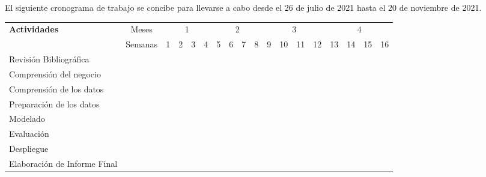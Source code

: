 \documentclass[11pt,letterpaper,oneside]{article}
\begin{document}
	El siguiente cronograma de trabajo se concibe para llevarse a cabo desde el 26 de julio de 2021 hasta el 20 de noviembre de 2021.
	
	\begin{center}
	\centering
	\tiny 
	
	\begin{tabular}{ |l c|c|c|c|c|c|c|c|c|c|c|c|c|c|c|c|c| }
	 \hline
	 \textbf{Actividades} & Meses & 
	 \multicolumn{4}{c|}{1} & 
	 \multicolumn{4}{c|}{2} & 
	 \multicolumn{4}{c|}{3} & 
	 \multicolumn{4}{c|}{4} 
	 \\ \cline{3-18}
	 
	 & Semanas & 
	 1 & 2 & 3 & 4 & 5 & 6 & 7 & 8 & 9 & 10 & 11 & 12 & 13 & 14 & 15 & 16 
	 \\ \hline
	 
	 Revisión Bibliográfica & &
	 \multicolumn{2}{G|}{} & & & & & & & & & & & & & &
	 \\ \hline
	 
	Comprensión del negocio & &
	&& \multicolumn{1}{G|}{} & & & & & & & & & & & & & 
	\\ \hline
	 
	Comprensión de los datos & &
	 & & & \multicolumn{3}{G|}{} & & & & & & & & & & 
	\\ \hline
	
	Preparación de los datos & &
	& & & & & \multicolumn{3}{G|}{} & & & & & & & & 
	\\ \hline
	
	Modelado & &
	& & & & & & & \multicolumn{5}{G|}{} & & & &
	\\ \hline
	
	Evaluación & &
	& & & & & & & & & & & \multicolumn{3}{G|}{} & & 
	\\ \hline
	
	Despliegue & &
	& & & & & & & & & & & & & \multicolumn{2}{G|}{} &
	\\ \hline
	 
	Elaboración de Informe Final & &
	& & & & & & & & & & & & & & \multicolumn{2}{G|}{} 
	\\ \hline
	 
	\end{tabular}
	\end{center}
	
\end{document}

